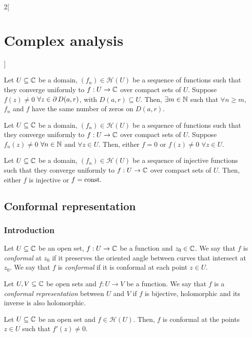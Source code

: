 \documentclass[../../../main.tex]{subfiles}
\begin{document}
\begin{multicols}{2}[\section{Complex analysis}]
\begin{theorem}
  \end{theorem}
  \begin{theorem}
    Let $U\subseteq \mathbb{C}$ be a domain, $(f_n)\in\mathcal{H}(U)$ be a sequence of functions such that they converge uniformly to $f:U\rightarrow\mathbb{C}$ over compact sets of $U$. Suppose $f(z)\ne 0$ $\forall z\in\operatorname{\partial}{D(a,r)}$, with $D(a,r)\subseteq U$. Then, $\exists m\in\mathbb{N}$ such that $\forall n\geq m$, $f_n$ and $f$ have the same number of zeros on $D(a,r)$.
  \end{theorem}
  \begin{corollary}
    Let $U\subseteq \mathbb{C}$ be a domain, $(f_n)\in\mathcal{H}(U)$ be a sequence of functions such that they converge uniformly to $f:U\rightarrow\mathbb{C}$ over compact sets of $U$. Suppose $f_n(z)\ne 0$ $\forall n\in\mathbb{N}$ and $\forall z\in U$. Then, either $f=0$ or $f(z)\ne 0$ $\forall z\in U$.
  \end{corollary}
  \begin{corollary}
    Let $U\subseteq \mathbb{C}$ be a domain, $(f_n)\in\mathcal{H}(U)$ be a sequence of injective functions such that they converge uniformly to $f:U\rightarrow\mathbb{C}$ over compact sets of $U$. Then, either $f$ is injective or $f=\text{const.}$
  \end{corollary}
  \subsection{Conformal representation}
  \subsubsection{Introduction}
  \begin{definition}
    Let $U\subseteq \mathbb{C}$ be an open set, $f:U\rightarrow\mathbb{C}$ be a function and $z_0\in\mathbb{C}$. We say that $f$ is \emph{conformal} at $z_0$ if it preserves the oriented angle between curves that intersect at $z_0$. We say that $f$ is \emph{conformal} if it is conformal at each point $z\in U$.
  \end{definition}
  \begin{definition}
    Let $U,V\subseteq \mathbb{C}$ be open sets and $f:U\rightarrow V$ be a function. We say that $f$ is a \emph{conformal representation} between $U$ and $V$ if $f$ is bijective, holomorphic and its inverse is also holomorphic.
  \end{definition}
  \begin{theorem}
    Let $U\subseteq \mathbb{C}$ be an open set and $f\in\mathcal{H}(U)$. Then, $f$ is conformal at the points $z\in U$ such that $f'(z)\ne 0$.
  \end{theorem}

\end{multicols}
\end{document}
